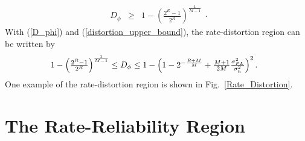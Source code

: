\documentclass[10pt,fleqn, twocolumn]{IEEEtran}
\begin{document}
\begin{equation}
\begin{array}{rcl}
D_{\phi}&\geq&1-\left(\frac{2^{R}-1}{2^R}\right)^{\frac{1}{M-1}}
\end{array}.\label{distortion_upper_bound}
\end{equation}
\noindent With (\ref{D_phi}) and (\ref{distortion_upper_bound}),
the rate-distortion region can be written by
\begin{equation}\hspace{-0.10in}
\begin{array}{l}
1-\left(\frac{2^{R}-1}{2^R}\right)^{\frac{1}{M-1}}\leq D_{\phi}
\leq
1-\left(1-2^{-\frac{R+M}{M}}+\frac{M+1}{2M}\frac{\sigma_{\mbox{\tiny
FL}}^{2}}{\sigma_{h}^{2}}\right)^2.
\end{array}
\end{equation}
\noindent One example of the rate-distortion region is shown in
Fig.~\ref{Rate_Distortion}.
\begin{figure}
\end{figure}


\section{The Rate-Reliability Region}
\end{document}
